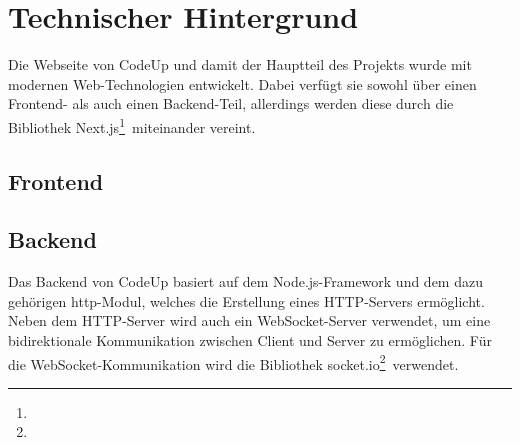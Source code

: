 \documentclass[main.tex]{subfiles}
\begin{document}
    \section{Technischer Hintergrund}
    Die Webseite von CodeUp und damit der Hauptteil des Projekts wurde mit modernen Web-Technologien entwickelt.
    Dabei verfügt sie sowohl über einen Frontend- als auch einen Backend-Teil, allerdings werden diese durch die Bibliothek \dq Next.js\dq \footnote{}\ miteinander vereint.
    \subsection{Frontend}

    \subsection{Backend}
    Das Backend von CodeUp basiert auf dem Node.js-Framework und dem dazu gehörigen \dq http\dq-Modul, welches die Erstellung eines HTTP-Servers ermöglicht.
    Neben dem HTTP-Server wird auch ein WebSocket-Server verwendet, um eine bidirektionale Kommunikation zwischen Client und Server zu ermöglichen.
    Für die WebSocket-Kommunikation wird die Bibliothek \dq socket.io\dq \footnote{}\ verwendet.
\end{document}
